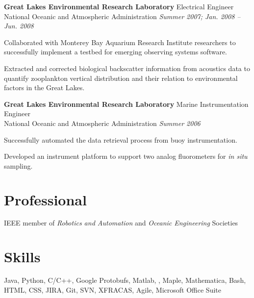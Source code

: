\documentclass[article]{resume}
\begin{document}
    \textbf{Great Lakes Environmental Research Laboratory } \hfill  Electrical Engineer \\ 
	National Oceanic and Atmospheric Administration \hfill \textsl{Summer 2007; Jan. 2008 -- Jun. 2008}  \\
    \vspace{ -2 mm}	
    \begin{list2}
	\item Collaborated with Monterey Bay Aquarium Research Institute researchers to successfully implement a testbed for emerging 	observing systems software.
	\item Extracted and corrected biological backscatter information from acoustics data to quantify zooplankton vertical distribution and 	their relation to environmental factors in the Great Lakes.
    \end{list2}\vspace{-2mm}

    \textbf{Great Lakes Environmental Research Laboratory } \hfill Marine Instrumentation Engineer  \\ 
	National Oceanic and Atmospheric Administration \hfill \textsl{Summer 2006} \\
    \vspace{ -2 mm}	
    \begin{list2}
	\item Successfully automated the data retrieval process from buoy instrumentation.
	\item Developed an instrument platform to support two analog fluorometers for \textit{in situ} sampling.
    \end{list2}

    \section{Professional} 
    
    IEEE member of \textsl{Robotics and Automation} and \textsl{Oceanic Engineering} Societies  
	    
    \section{Skills} 

    Java, Python, C/C++, Google Protobufs, Matlab, \LaTeXe, Maple, Mathematica, Bash, HTML, CSS, JIRA, Git, SVN, XFRACAS, Agile, Microsoft Office Suite

\end{document}
